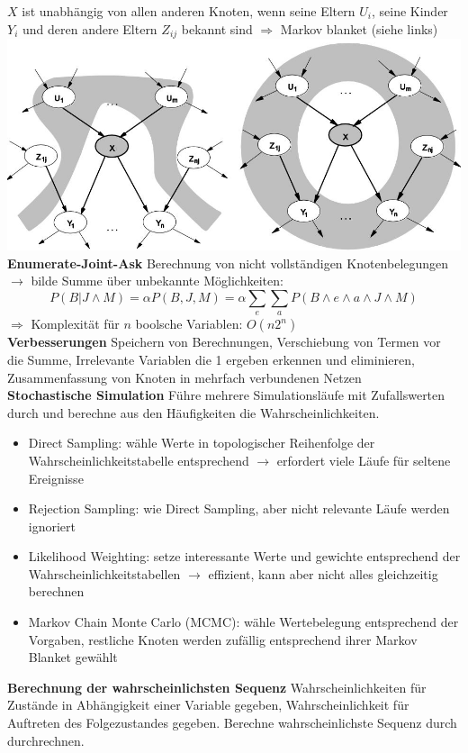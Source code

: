 \documentclass[12pt]{article}
\begin{document}
	$X$ ist unabhängig von allen anderen Knoten, wenn seine Eltern $U_i$, seine Kinder $Y_i$ und deren andere Eltern $Z_{ij}$ bekannt sind $\Rightarrow$ Markov blanket (siehe links)\\
	\includegraphics[width=\textwidth]{figures/markov-blanket.JPG}
	\textbf{Enumerate-Joint-Ask} Berechnung von nicht vollständigen Knotenbelegungen $\rightarrow$ bilde Summe über unbekannte Möglichkeiten: $$P(B|J \wedge M) = \alpha P(B,J,M) = \alpha \sum_e \sum_a P(B \wedge e \wedge a \wedge J \wedge M)$$
	$\Rightarrow$ Komplexität für $n$ boolsche Variablen: $O(n2^n)$\\
	\textbf{Verbesserungen} Speichern von Berechnungen, Verschiebung von Termen vor die Summe, Irrelevante Variablen die 1 ergeben erkennen und eliminieren, Zusammenfassung von Knoten in mehrfach verbundenen Netzen\\
	\textbf{Stochastische Simulation} Führe mehrere Simulationsläufe mit Zufallswerten durch und berechne aus den Häufigkeiten die Wahrscheinlichkeiten.
	\begin{itemize}
		\item Direct Sampling: wähle Werte in topologischer Reihenfolge der Wahrscheinlichkeitstabelle entsprechend $\rightarrow$ erfordert viele Läufe für seltene Ereignisse
		\item Rejection Sampling: wie Direct Sampling, aber nicht relevante Läufe werden ignoriert
		\item Likelihood Weighting: setze interessante Werte und gewichte entsprechend der Wahrscheinlichkeitstabellen $\rightarrow$ effizient, kann aber nicht alles gleichzeitig berechnen
		\item Markov Chain Monte Carlo (MCMC): wähle Wertebelegung entsprechend der Vorgaben, restliche Knoten werden zufällig entsprechend ihrer Markov Blanket gewählt
	\end{itemize}
	\textbf{Berechnung der wahrscheinlichsten Sequenz} Wahrscheinlichkeiten für Zustände in Abhängigkeit einer Variable gegeben, Wahrscheinlichkeit für Auftreten des Folgezustandes gegeben. Berechne wahrscheinlichste Sequenz durch durchrechnen.\\
\end{document}
